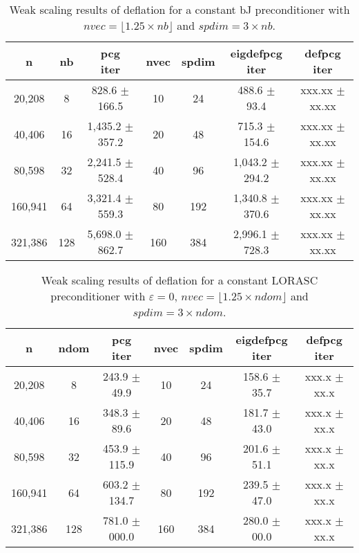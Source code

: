 \documentclass{article}
\begin{document}
\begin{table}[ht]
	\caption{Weak scaling results of deflation for a constant bJ preconditioner with $nvec=\lfloor1.25\times nb\rfloor$ and $spdim=3\times nb$.}
	\centering
	\begin{tabular}{|c|c|c|c|c|c|c|}
		\hline
		n & nb & \makecell{pcg\\ iter} & nvec & spdim & \makecell{eigdefpcg\\ iter} & \makecell{defpcg\\ iter}\\
		\hline
		20,208  &   8 &   828.6 $\pm$ 166.5 &  10 &  24 &   488.6 $\pm$  93.4 & xxx.xx $\pm$ xx.xx \\
		40,406  &  16 & 1,435.2 $\pm$ 357.2 &  20 &  48 &   715.3 $\pm$ 154.6 & xxx.xx $\pm$ xx.xx \\
		80,598  &  32 & 2,241.5 $\pm$ 528.4 &  40 &  96 & 1,043.2 $\pm$ 294.2 & xxx.xx $\pm$ xx.xx \\
		160,941 &  64 & 3,321.4 $\pm$ 559.3 &  80 & 192 & 1,340.8 $\pm$ 370.6   & xxx.xx $\pm$ xx.xx \\
		321,386 & 128 & 5,698.0 $\pm$ 862.7 & 160 & 384 & 2,996.1 $\pm$ 728.3 & xxx.xx $\pm$ xx.xx \\
		\hline
	\end{tabular}
	\label{Tab:005}
\end{table}



\begin{table}[ht]
\caption{Weak scaling results of deflation for a constant LORASC preconditioner with $\varepsilon=0$, $nvec=\lfloor1.25\times ndom\rfloor$ and $spdim=3\times ndom$.}
\centering
	\begin{tabular}{|c|c|c|c|c|c|c|}
	\hline
	n & ndom & \makecell{pcg\\ iter} & nvec & spdim & \makecell{eigdefpcg\\ iter} & \makecell{defpcg\\ iter}\\
	\hline
	20,208  &   8 & 243.9 $\pm$  49.9 &  10 &  24 & 158.6 $\pm$ 35.7 & xxx.x $\pm$ xx.x \\
	40,406  &  16 & 348.3 $\pm$  89.6 &  20 &  48 & 181.7 $\pm$ 43.0 & xxx.x $\pm$ xx.x \\
	80,598  &  32 & 453.9 $\pm$ 115.9 &  40 &  96 & 201.6 $\pm$ 51.1 & xxx.x $\pm$ xx.x \\
	160,941 &  64 & 603.2 $\pm$ 134.7 &  80 & 192 & 239.5 $\pm$ 47.0 & xxx.x $\pm$ xx.x \\
	321,386 & 128 & 781.0 $\pm$ 000.0 & 160 & 384 & 280.0 $\pm$ 00.0 & xxx.x $\pm$ xx.x \\
	\hline
\end{tabular}
\label{Tab:010}
\end{table}
\end{document}
